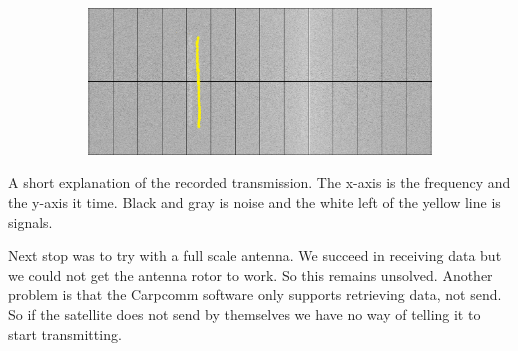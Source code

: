 \begin{figure}
\begin{subfigure}{.5\textwidth}
	\centering
	\includegraphics[width=\textwidth]{Figures/sattelite_transmition}
	\label{fig: Transmission}
\end{subfigure}
\end{figure}
A short explanation of the recorded transmission. The x-axis is the frequency and the y-axis it time. Black and gray is noise and the white left of the yellow line is signals.

 Next stop was to try with a full scale antenna. We succeed in receiving data but we could not get the antenna rotor to work. So this remains unsolved. Another problem is that the Carpcomm software only supports retrieving data, not send. So if the satellite does not send by themselves we have no way of telling it to start transmitting. 




